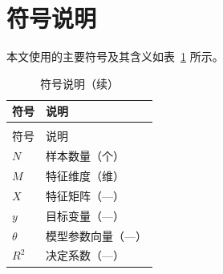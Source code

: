 \section{符号说明}

本文使用的主要符号及其含义如表~\ref{tab:symbols} 所示。

\begin{longtable}{@{}>{\centering\arraybackslash}p{}>{\raggedright\arraybackslash}p{}@{}}
  \caption{符号说明}
  \label{tab:symbols} \\
  \toprule
  符号 & 说明 \\
  \midrule
  \endfirsthead
  \caption{符号说明（续）} \\
  \toprule
  符号 & 说明 \\
  \midrule
  \endhead
  \bottomrule
  \endfoot
  $N$ & 样本数量（个）\\
  $M$ & 特征维度（维）\\
  $X$ & 特征矩阵（---）\\
  $y$ & 目标变量（---）\\
  $\theta$ & 模型参数向量（---）\\
  $R^2$ & 决定系数（---）\\
\end{longtable}
